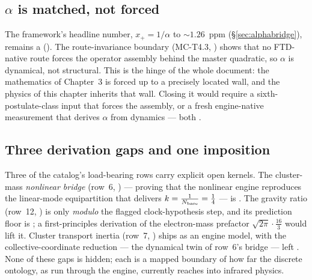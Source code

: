 \subsection{$\alpha$ is matched, not forced}

The framework's headline number, $x_+ = 1/\alpha$ to ${\sim}1.26$~ppm
(\S\ref{sec:alphabridge}), remains a  (). The route-invariance
boundary (MC-T4.3, ) shows that no FTD-native route forces the operator
assembly behind the master quadratic, so $\alpha$ is dynamical, not structural. This
is the hinge of the whole document: the mathematics of Chapter~3 is forced up to a
precisely located wall, and the physics of this chapter inherits that wall. Closing
it would require a sixth-postulate-class input that forces the assembly, or a fresh
engine-native measurement that derives $\alpha$ from dynamics --- both .

\subsection{Three derivation gaps and one imposition}

Three of the catalog's load-bearing rows carry explicit open kernels. The
cluster-mass \emph{nonlinear bridge} (row~6, ) --- proving that the
nonlinear engine reproduces the linear-mode equipartition that delivers $k=\tfrac{1}{N_{\mathrm{base}}}=\tfrac14$
--- is . The gravity ratio (row~12, ) is  only
\emph{modulo} the flagged clock-hypothesis  step, and its prediction floor
is ; a first-principles derivation of the electron-mass prefactor
$\sqrt{2\pi}\cdot\tfrac{16}{3}$ would lift it. Cluster transport inertia (row~7,
) ships as an  engine model, with the collective-coordinate
reduction --- the dynamical twin of row~6's bridge --- left . None of
these gaps is hidden; each is a mapped boundary of how far the discrete ontology, as
run through the engine, currently reaches into infrared physics.
